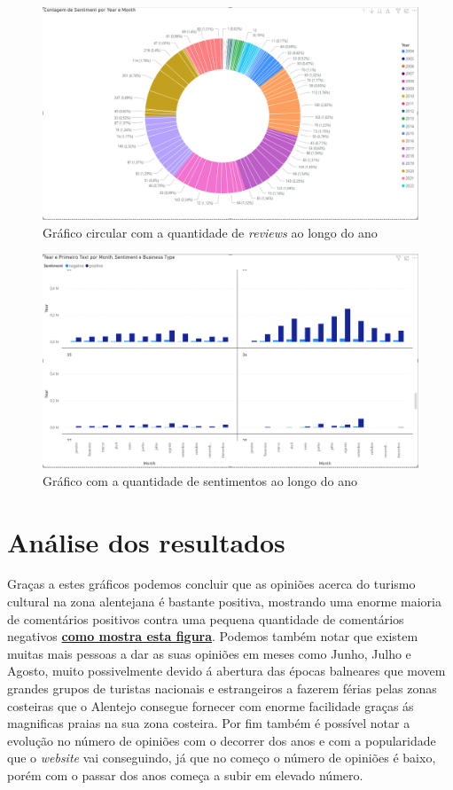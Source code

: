 \begin{figure}[!htb]
\centering
\includegraphics[width=14cm]{figuras/NrReviewsPerYear/CircleGraph.PNG}
\caption{Gráfico circular com a quantidade de \textit{reviews} ao longo do ano}
\label{fig:revspercentbejatimed}
\end{figure}

\begin{figure}[!htb]
\centering
\includegraphics[width=14cm]{figuras/Pos&NegSentimentsPerMonth&BusinessType/2.PNG}
\caption{Gráfico com a quantidade de sentimentos ao longo do ano}
\label{fig:sentvarbejatimed}
\end{figure}

\clearpage
\section {Análise dos resultados}

Graças a estes gráficos podemos concluir que as opiniões acerca do turismo cultural na zona alentejana é bastante positiva, mostrando uma enorme maioria de comentários positivos contra uma pequena quantidade de comentários negativos \hyperref[fig:sentvarbejatimed]{\textbf{como mostra esta figura}}. Podemos também notar que existem muitas mais pessoas a dar as suas opiniões em meses como Junho, Julho e Agosto, muito possivelmente devido á abertura das épocas balneares que movem grandes grupos de turistas nacionais e estrangeiros a fazerem férias pelas zonas costeiras que o Alentejo consegue fornecer com enorme facilidade graças ás magnificas praias na sua zona costeira. Por fim também é possível notar a evolução no número de opiniões com o decorrer dos anos e com a popularidade que o \textit{website} vai conseguindo, já que no começo o número de opiniões é baixo, porém com o passar dos anos começa a subir em elevado número.

